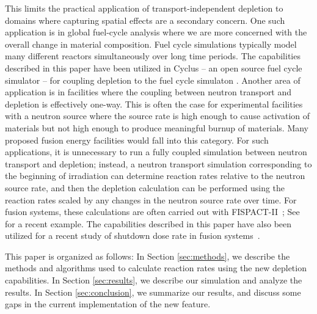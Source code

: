     This limits the practical application of transport-independent depletion to
    domains where capturing spatial effects are a secondary concern. One
    such application is in global fuel-cycle analysis where we are more
    concerned with the overall change in material composition. Fuel cycle
    simulations typically model many different reactors simultaneously over
    long time periods. The capabilities described in this paper
    have been utilized in Cyclus \citep{huff_fundamental_2016} -- an open source
    fuel cycle simulator -- for coupling depletion to the fuel cycle
    simulaton \citep{bachmann_os_2024}. Another area of application is in
    facilities where the coupling between neutron transport and depletion is
    effectively one-way.  This is often the case for experimental facilities
    with a neutron source where the source rate is high enough to cause
    activation of materials but not high enough to produce meaningful burnup of
    materials. Many proposed fusion energy facilities would fall into this
    category. For such applications, it is unnecessary to run a fully coupled
    simulation between neutron transport and depletion; instead, a neutron
    transport simulation corresponding to the beginning of irradiation can
    determine reaction rates relative to the neutron source rate, and then the
    depletion calculation can be performed using the reaction rates scaled by
    any changes in the neutron source rate over time. For fusion systems, these
    calculations are often carried out with FISPACT-II~\citep{sublet2017nds};
    See \citet{eade2020nf} for a recent example. The capabilities described in
    this paper have also been utilized for a recent study of shutdown dose rate
    in fusion systems~\citep{peterson2024nf}.

    This paper is organized as follows: In Section \ref{sec:methods}, we describe
    the methods and algorithms used to calculate reaction rates using the new
    depletion capabilities. In Section \ref{sec:results}, we describe our
    simulation and analyze the results. In Section \ref{sec:conclusion}, we
    summarize our results, and discuss some gaps in the current implementation
    of the new feature.


